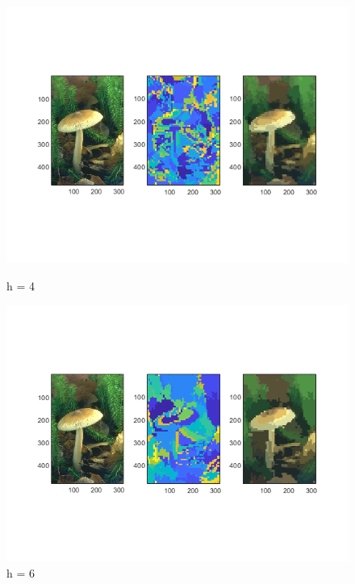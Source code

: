 \documentclass[12pt]{article}
\begin{document}
\begin{figure}[H]
	\begin{minipage}{.5\textwidth}
	 \includegraphics[width=\textwidth,height=\textheight,keepaspectratio]{figs/2-b-ms-1-h4}
	 \caption{\small h = 4}
	\end{minipage}
	\begin{minipage}{.5\textwidth}
	 \includegraphics[width=\textwidth,height=\textheight,keepaspectratio]{figs/2-b-ms-1-h6}
	 \caption{\small h = 6}
	\end{minipage}
	\begin{minipage}{.5\textwidth}

\end{minipage}
\end{figure}
\end{document}
